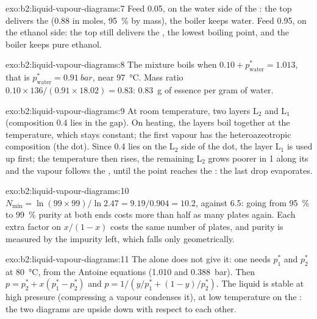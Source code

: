 \begin{solution}{exo:b2:liquid-vapour-diagrams:7}
Feed 0.05, on the water side of the : the top delivers the 
(0.88 in moles, 95~\% by mass), the boiler keeps water. Feed 0.95, on the
ethanol side: the top still delivers the , the lowest boiling point,
and the boiler keeps pure ethanol.
\end{solution}

\begin{solution}{exo:b2:liquid-vapour-diagrams:8}
The mixture boils when $0.10 + p^*_{\text{water}} = 1.013$, that is
$p^*_{\text{water}} = \qty{0.91}{bar}$, near \qty{97}{\degreeCelsius}. Mass ratio
$0.10 \times 136/(0.91 \times 18.02) = 0.83$: \qty{0.83}{g} of essence per gram
of water.
\end{solution}

\begin{solution}{exo:b2:liquid-vapour-diagrams:9}
At room temperature, two layers L$_2$ and L$_1$ (composition 0.4 lies in the
gap). On heating, the layers boil together at the 
temperature, which stays constant; the first vapour has the heteroazeotropic
composition (the dot). Since 0.4 lies on the L$_2$ side of the dot, the layer
L$_1$ is used up first; the temperature then rises, the remaining L$_2$ grows
poorer in 1 along its  and the vapour follows the , until
the point reaches the : the last drop evaporates.
\end{solution}

\begin{solution}{exo:b2:liquid-vapour-diagrams:10}
$N_{\min} = \ln(99 \times 99)/\ln 2.47 = 9.19/0.904 = 10.2$, against 6.5: going
from 95~\% to 99~\% purity at both ends costs more than half as many plates
again. Each extra factor on $x/(1 - x)$ costs the same number of plates, and
purity is measured by the impurity left, which falls only geometrically.
\end{solution}

\begin{solution}{exo:b2:liquid-vapour-diagrams:11}
The  alone does not give it: one needs $p_1^*$ and $p_2^*$ at
\qty{80}{\degreeCelsius}, from the Antoine equations (1.010 and
\qty{0.388}{bar}). Then $p = p_2^* + x(p_1^* - p_2^*)$ and $p = 1/(y/p_1^* + (1 -
y)/p_2^*)$. The liquid is stable at high pressure (compressing a vapour
condenses it), at low temperature on the : the two diagrams
are upside down with respect to each other.
\end{solution}

